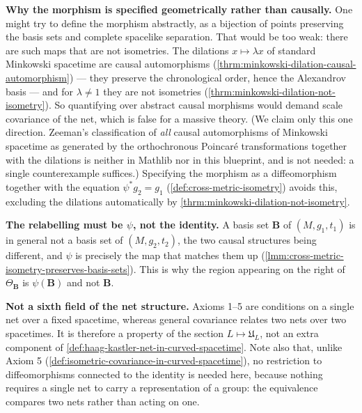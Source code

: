 \textbf{Why the morphism is specified geometrically rather than causally.} One might try to define the morphism abstractly, as a bijection of points preserving the basis sets and complete spacelike separation. That would be too weak: there are such maps that are not isometries. The dilations $x \mapsto \lambda x$ of standard Minkowski spacetime are causal automorphisms (\ref{thrm:minkowski-dilation-causal-automorphism}) --- they preserve the chronological order, hence the Alexandrov basis --- and for $\lambda \neq 1$ they are not isometries (\ref{thrm:minkowski-dilation-not-isometry}). So quantifying over abstract causal morphisms would demand scale covariance of the net, which is false for a massive theory. (We claim only this one direction. Zeeman's classification of \emph{all} causal automorphisms of Minkowski spacetime as generated by the orthochronous Poincar\'e transformations together with the dilations is neither in Mathlib nor in this blueprint, and is not needed: a single counterexample suffices.) Specifying the morphism as a diffeomorphism together with the equation $\psi^*g_2 = g_1$ (\ref{def:cross-metric-isometry}) avoids this, excluding the dilations automatically by \ref{thrm:minkowski-dilation-not-isometry}.

\textbf{The relabelling must be $\psi$, not the identity.} A basis set $\mathbf{B}$ of $(M,g_1,t_1)$ is in general not a basis set of $(M,g_2,t_2)$, the two causal structures being different, and $\psi$ is precisely the map that matches them up (\ref{lmm:cross-metric-isometry-preserves-basis-sets}). This is why the region appearing on the right of $\Theta_{\mathbf{B}}$ is $\psi(\mathbf{B})$ and not $\mathbf{B}$.

\textbf{Not a sixth field of the net structure.} Axioms 1--5 are conditions on a single net over a fixed spacetime, whereas general covariance relates two nets over two spacetimes. It is therefore a property of the section $L \mapsto \mathfrak{U}_L$, not an extra component of \ref{def:haag-kastler-net-in-curved-spacetime}. Note also that, unlike Axiom 5 (\ref{def:isometric-covariance-in-curved-spacetime}), no restriction to diffeomorphisms connected to the identity is needed here, because nothing requires a single net to carry a representation of a group: the equivalence compares two nets rather than acting on one.
